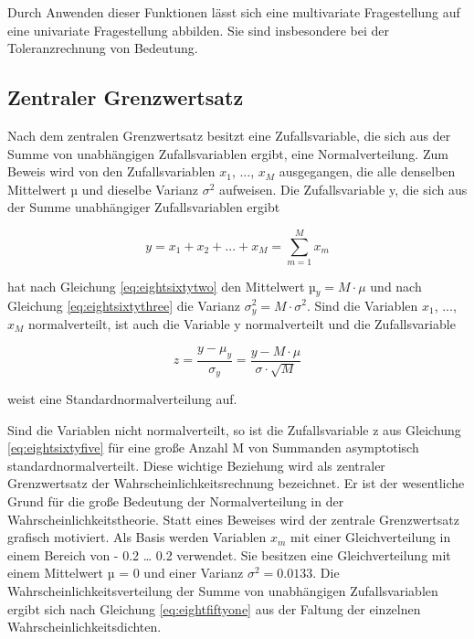 \noindent Durch Anwenden dieser Funktionen l\"{a}sst sich eine multivariate Fragestellung auf eine univariate Fragestellung abbilden. Sie sind insbesondere bei der Toleranzrechnung von Bedeutung.

\clearpage

\subsection{Zentraler Grenzwertsatz}

\noindent Nach dem zentralen Grenzwertsatz besitzt eine Zufallsvariable, die sich aus der Summe von unabh\"{a}ngigen Zufallsvariablen ergibt, eine Normalverteilung. Zum Beweis wird von den Zufallsvariablen $x_{1}$, ..., $x_{M}$ ausgegangen, die alle denselben Mittelwert µ und dieselbe Varianz $\sigma^{2}$ aufweisen. Die Zufallsvariable y, die sich aus der Summe unabh\"{a}ngiger Zufallsvariablen ergibt

\begin{equation}\label{eq:eightsixtyfour}
y=x_{1} +x_{2} +...+x_{M} =\sum _{m=1}^{M}x_{m}
\end{equation}

\noindent hat nach Gleichung \eqref{eq:eightsixtytwo} den Mittelwert µ${}_{y} = M\cdot\mu$ und nach Gleichung \eqref{eq:eightsixtythree} die Varianz $\sigma_{y}^{2}= M\cdot \sigma^{2}$. Sind die Variablen $x_{1}$, ..., $x_{M}$ normalverteilt, ist auch die Variable y normalverteilt und die Zufallsvariable 

\begin{equation}\label{eq:eightsixtyfive}
z=\dfrac{y-\mu _{y}}{\sigma _{y}} =\dfrac{y-M\cdot \mu}{\sigma \cdot \sqrt{M}}
\end{equation}

\noindent weist eine Standardnormalverteilung auf.\newline

\noindent Sind die Variablen nicht normalverteilt, so ist die Zufallsvariable z aus Gleichung \eqref{eq:eightsixtyfive} f\"{u}r eine gro{\ss}e Anzahl M von Summanden asymptotisch standardnormalverteilt. Diese wichtige Beziehung wird als zentraler Grenzwertsatz der Wahrscheinlichkeitsrechnung bezeichnet. Er ist der wesentliche Grund f\"{u}r die gro{\ss}e Bedeutung der Normalverteilung in der Wahrscheinlichkeitstheorie. Statt eines Beweises wird der zentrale Grenzwertsatz grafisch motiviert. Als Basis werden Variablen $x_{m}$ mit einer Gleichverteilung in einem Bereich von - 0.2 {\dots} 0.2 verwendet. Sie besitzen eine Gleichverteilung mit einem Mittelwert µ = 0 und einer Varianz $\sigma^{2} = 0.0133$. Die Wahrscheinlichkeitsverteilung der Summe von unabh\"{a}ngigen Zufallsvariablen ergibt sich nach Gleichung \eqref{eq:eightfiftyone} aus der Faltung der einzelnen Wahrscheinlichkeitsdichten.

